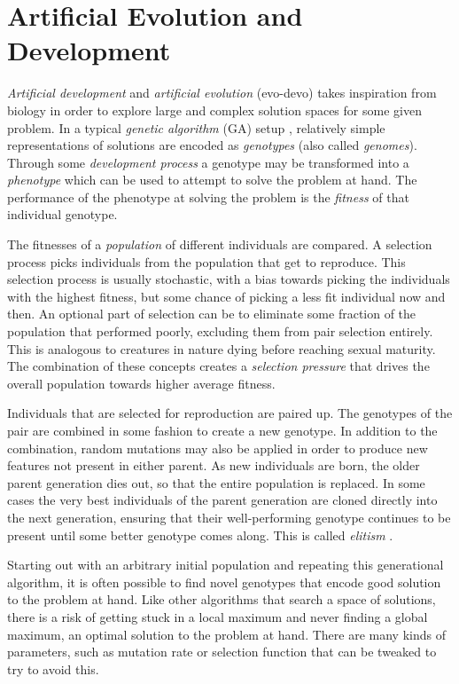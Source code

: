 \section{Artificial Evolution and Development}
\textit{Artificial development} and \textit{artificial evolution} (evo-devo) takes inspiration from biology in order to explore large and complex solution spaces for some given problem.
In a typical \textit{genetic algorithm} (GA) setup \cite{holland1992genetic, mitchell-2001},
relatively simple representations of solutions are encoded as \textit{genotypes} (also called \textit{genomes}).
Through some \textit{development process} a genotype may be transformed into a \textit{phenotype} which can be used to attempt to solve the problem at hand.
The performance of the phenotype at solving the problem is the \textit{fitness} of that individual genotype.

The fitnesses of a \textit{population} of different individuals are compared.
A selection process picks individuals from the population that get to reproduce.
This selection process is usually stochastic, with a bias towards picking the individuals with the highest fitness, but some chance of picking a less fit individual now and then.
An optional part of selection can be to eliminate some fraction of the population that performed poorly, excluding them from pair selection entirely.
This is analogous to creatures in nature dying before reaching sexual maturity.
The combination of these concepts creates a \textit{selection pressure} that drives the overall population towards higher average fitness.

Individuals that are selected for reproduction are paired up.
The genotypes of the pair are combined in some fashion to create a new genotype.
In addition to the combination, random mutations may also be applied in order to produce new features not present in either parent.
As new individuals are born, the older parent generation dies out, so that the entire population is replaced.
In some cases the very best individuals of the parent generation are cloned directly into the next generation,
ensuring that their well-performing genotype continues to be present until some better genotype comes along.
This is called \textit{elitism} \cite{vasconcelos2001improvements}.

Starting out with an arbitrary initial population and repeating this generational algorithm,
it is often possible to find novel genotypes that encode good solution to the problem at hand.
Like other algorithms that search a space of solutions,
there is a risk of getting stuck in a local maximum and never finding a global maximum,
an optimal solution to the problem at hand.
There are many kinds of parameters, such as mutation rate or selection function that can be tweaked to try to avoid this.

